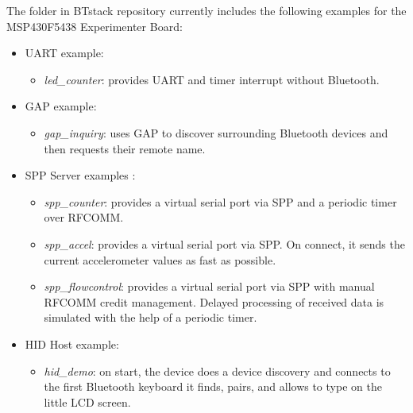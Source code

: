 \documentclass[a4paper,titlepage,oneside,12pt]{amsart} %
\begin{document}
\label{examples}
The  folder in BTstack repository currently includes the following examples for the MSP430F5438 Experimenter Board:
\begin{itemize}
\item UART example:
    \begin{itemize}
    \item \emph{led\_counter}: provides UART and timer interrupt without Bluetooth.
    \end{itemize}
\item GAP example:
    \begin{itemize}
    \item \emph{gap\_inquiry}: uses GAP to discover surrounding Bluetooth devices and then requests their remote name.
    \end{itemize}
\item SPP Server examples :
    \begin{itemize}
    \item \emph{spp\_counter}: provides a virtual serial port via SPP and a periodic timer over RFCOMM. 
    \item \emph{spp\_accel}: provides a virtual serial port via SPP. On connect, it sends the current accelerometer values as fast as possible.
    \item \emph{spp\_flowcontrol}: provides a virtual serial port via SPP with manual RFCOMM credit management. Delayed processing of received data is simulated with the help of a periodic timer. 
    \end{itemize}
\item HID Host example:
    \begin{itemize}                                    
    \item \emph{hid\_demo}: on start, the device does a device discovery and connects to the first Bluetooth keyboard it finds, pairs, and allows to type on the little LCD screen. 
    \end{itemize}

\end{itemize}
\end{document}

